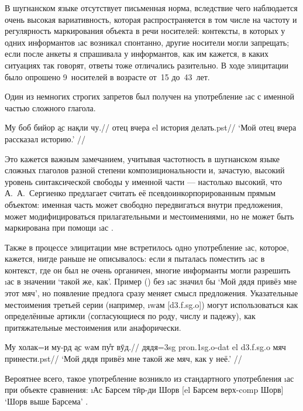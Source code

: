 В шугнанском языке отсутствует письменная норма, вследствие чего наблюдается очень высокая вариативность, которая распространяется в том числе на частоту и регулярность маркирования объекта в речи носителей: контексты, в которых у одних информантов \i{ас} возникал спонтанно, другие носители могли запрещать; если после анкеты я спрашивала у информантов, как им кажется, в каких ситуациях так говорят, ответы тоже отличались разительно. В ходе элицитации было опрошено 9~носителей в возрасте от~15 до~43~лет.

Один из немногих строгих запретов был получен на употребление \i{ас} с именной частью сложного глагола.

\begingl
\gla \ljudge{*}Му боб бийор \b{ас} нақли чу.//
 отец вчера {\sc el} история делать.{\sc pst}//
\glft ‘Мой отец вчера рассказал историю.’ //
\endgl \xe

Это кажется важным замечанием, учитывая частотность в шугнанском языке сложных глаголов разной степени композициональности и, зачастую, высокий уровень синтаксической свободы у именной части — настолько высокий, что А.~А.~Сергиенко предлагает считать её псевдоинкорпорированным прямым объектом: именная часть может свободно передвигаться внутри предложения, может модифицироваться прилагательными и местоимениями, но не может быть маркирована при помощи \i{ас} \parencite[7]{sergienko2022}.

Также в процессе элицитации мне встретилось одно употребление \i{ас}, которое, кажется, нигде раньше не описывалось: если я пыталась поместить \i{ас} в контекст, где он был не очень органичен, многие информанты могли разрешить \i{ас} в значении ‘такой же, как’. Пример () без \i{ас} значил бы ‘Мой дядя привёз мне этот мяч’, но появление предлога сразу меняет смысл предложения. Указательные местоимения третьей серии (например, \i{wам} [{\sc d3.f.sg.o}]) могут использоваться как определённые артикли (согласующиеся по роду, числу и падежу), как притяжательные местоимения или анафорически.

\begingl
\gla Му холак=и му-рд \b{ас} wам пу̊т вӯд.//
 дядя={\sc 3sg} {\sc pron.1sg.o-dat} {\sc el} {\sc d3.f.sg.o} мяч принести.{\sc pst}//
\glft ‘Мой дядя привёз мне такой же мяч, как у неё.’ \trailingcitation{[элицитация, 2022]}//
\endgl \xe

Вероятнее всего, такое употребление возникло из стандартного употребления \i{ас} при объекте сравнения: \i{Ас Барсем тӣр-ди Шорв} [{\sc el} Барсем верх-{\sc comp} Шорв] ‘Шорв выше Барсема’ \parencite[140]{karamshoev1988}.

